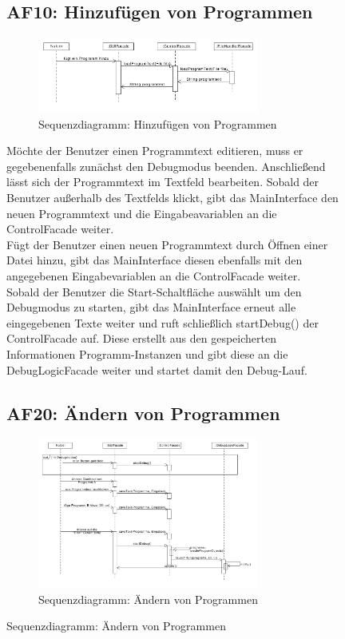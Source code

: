﻿\documentclass[parskip=full]{scrartcl}
\begin{document}
\begin{figure}[!h]
\newpage
\subsection{AF10: Hinzufügen von Programmen}
\begin{figure}[!h]
\centering
\includegraphics[width=0.8\textwidth]{diagrammIdeenUmlet/SequenceDiagrams/seq_AF10PDF.pdf}
\caption{Sequenzdiagramm: Hinzufügen von Programmen}
\end{figure}
Möchte der Benutzer einen Programmtext editieren, muss er gegebenenfalls zunächst den Debugmodus beenden.
Anschließend lässt sich der Programmtext im Textfeld bearbeiten. Sobald der Benutzer außerhalb des
Textfelds klickt, gibt das MainInterface den neuen Programmtext und die Eingabeavariablen an die ControlFacade weiter. \\
Fügt der Benutzer einen neuen Programmtext durch Öffnen einer Datei hinzu, gibt das MainInterface diesen ebenfalls
mit den angegebenen Eingabevariablen an die ControlFacade weiter.\\
Sobald der Benutzer die Start-Schaltfläche auswählt um den Debugmodus zu starten, gibt das MainInterface erneut
alle eingegebenen Texte weiter und ruft schließlich startDebug() der ControlFacade auf. Diese erstellt aus den gespeicherten Informationen
Programm-Instanzen und gibt diese an die DebugLogicFacade weiter und startet damit den Debug-Lauf.


\newpage
\subsection{AF20: Ändern von Programmen}
\begin{figure}[!h]
\centering
\includegraphics[width=0.8\textwidth]{diagrammIdeenUmlet/SequenceDiagrams/seq_AF20PDF.pdf}
\caption{Sequenzdiagramm: Ändern von Programmen}
\end{figure}


\end{figure}
\end{document}
